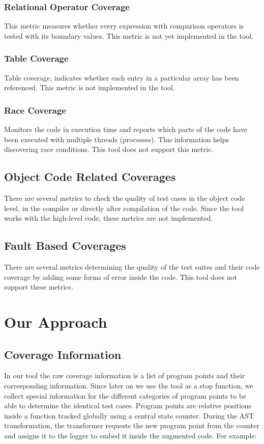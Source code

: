 \documentclass[12pt,a4paper]{report}
\begin{document}
\subsection{Relational Operator Coverage}
This metric measures whether every expression with comparison operators is tested with its boundary values.
This metric is not yet implemented in the tool.
 
\subsection{Table Coverage}
Table coverage, indicates whether each entry in a particular array has been referenced.\cite{andersson2005automatic}
This metric is not implemented in the tool.

\subsection{Race Coverage}
Monitors the code in execution time and reports which parts of the code have been executed with multiple threads (processes). This information helps discovering race conditions. 
This tool does not support this metric.

\section{Object Code Related Coverages}
There are several metrics to check the quality of test cases in the object code level, in the compiler or directly after compilation of the code.
Since the tool works with the high-level code, these metrics are not implemented.

\section{Fault Based Coverages}
There are several metrics determining the quality of the test suites and their code coverage by adding some forms of error inside the code.
This tool does not support these metrics.

\chapter{Our Approach}
\newpage

\section{Coverage Information}
In our tool the raw coverage information is a list of program points and their corresponding information. Since later on we use the tool as a stop function, we collect special information for the different categories of program points to be able to determine the identical test cases. Program points are relative positions inside a function tracked globally using a central state counter. During the AST transformation, the transformer requests the new program point from the counter and assigns it to the logger to embed it inside the augmented code. For example:
\end{document}
